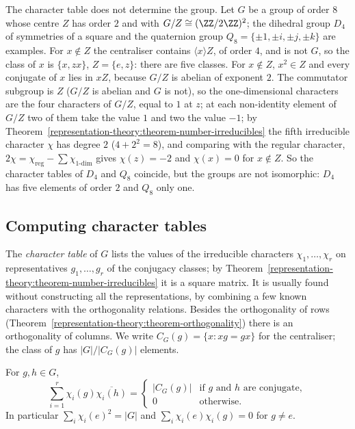 \begin{counterexample}\label{representation-theory:counterexample-character-table}
The character table does not determine the group. Let $G$ be a group of order $8$ whose centre $Z$ has order $2$ and with $G/Z \cong (\ZZ/2\ZZ)^2$; the dihedral group $D_4$ of symmetries of a square and the quaternion group
$Q_8 = \{\pm1, \pm i, \pm j, \pm k\}$ are examples. For $x \notin Z$ the centraliser contains $\langle x\rangle Z$, of order $4$, and is not $G$, so the class of $x$ is $\{x, zx\}$, $Z = \{e, z\}$: there are five classes. For $x \notin Z$, $x^2 \in Z$ and every conjugate of $x$ lies in $xZ$, because $G/Z$ is abelian of exponent $2$. The commutator subgroup is
$Z$ ($G/Z$ is abelian and $G$ is not), so the one-dimensional characters are the four characters of $G/Z$, equal to $1$ at $z$; at each non-identity element of $G/Z$ two of them take the value $1$ and two the value $-1$; by Theorem~\ref{representation-theory:theorem-number-irreducibles} the fifth irreducible character $\chi$ has
degree $2$ ($4 + 2^2 = 8$), and comparing with the regular character, $2\chi = \chi_{\mathrm{reg}} - \sum\chi_{1\text{-dim}}$ gives $\chi(z) = -2$ and $\chi(x) = 0$ for $x \notin Z$. So the character tables of $D_4$ and $Q_8$ coincide, but the
groups are not isomorphic: $D_4$ has five elements of order $2$ and $Q_8$ only one.
\end{counterexample}

\subsection{Computing character tables}\label{representation-theory:subsection-character-tables}

The \emph{character table} of $G$ lists the values of the irreducible characters $\chi_1, \ldots, \chi_r$ on representatives $g_1, \ldots, g_r$ of the conjugacy classes;
by Theorem~\ref{representation-theory:theorem-number-irreducibles} it is a square matrix. It is usually found without constructing all the representations, by
combining a few known characters with the orthogonality relations. Besides the orthogonality of rows (Theorem~\ref{representation-theory:theorem-orthogonality}) there
is an orthogonality of columns. We write $C_G(g) = \{x : xg = gx\}$ for the centraliser; the class of $g$ has $|G|/|C_G(g)|$ elements.

\begin{proposition}\label{representation-theory:proposition-column-orthogonality}
For $g, h \in G$,
\[
\sum_{i=1}^r\chi_i(g)\overline{\chi_i(h)} = \begin{cases}|C_G(g)| & \text{if } g \text{ and } h \text{ are conjugate},\\ 0 & \text{otherwise.}\end{cases}
\]
In particular $\sum_i\chi_i(e)^2 = |G|$ and $\sum_i\chi_i(e)\chi_i(g) = 0$ for $g \neq e$.
\end{proposition}

